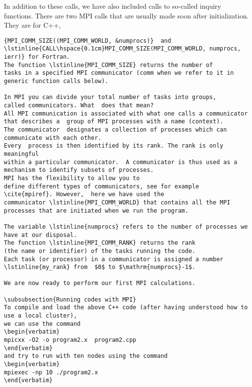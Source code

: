 In addition to these calls, we have also included calls to so-called 
inquiry functions. There are two 
MPI calls that are usually made soon after initialization. They are for C++, 
\begin{lstlisting}{MPI_COMM_SIZE((MPI_COMM_WORLD, &numprocs)}  and 
\lstinline{CALL\hspace{0.1cm}MPI_COMM_SIZE(MPI_COMM_WORLD, numprocs, ierr)} for Fortran.  
The function \lstinline{MPI_COMM_SIZE} returns the number of 
tasks in a specified MPI communicator (comm when we refer to it in generic function calls below). 

In MPI you can divide your total number of tasks into groups, 
called communicators. What  does that mean?
All MPI communication is associated with what one calls a communicator
that describes a  group of MPI processes with a name (context). 
The communicator  designates a collection of processes which can communicate with each other. 
Every  process is then identified by its rank. The rank is only meaningful
within a particular communicator.  A communicator is thus used as a mechanism to identify subsets of processes.  
MPI has the flexibility to allow you to
define different types of communicators, see for example \cite{mpiref}. However,  here we have used the
communicator \lstinline{MPI_COMM_WORLD} that contains all the MPI
processes that are initiated when we run the program.

The variable \lstinline{numprocs} refers to the number of processes we have at our disposal.
The function \lstinline{MPI_COMM_RANK} returns the rank 
(the name or identifier) of the tasks running the code. 
Each task (or processor) in a communicator is assigned a number \lstinline{my_rank} from  $0$ to $\mathrm{numprocs}-1$. 

We are now ready to perform our first MPI calculations.

\subsubsection{Running codes with MPI}
To compile and load the above C++ code (after having understood how to use a local cluster), 
we can use the command 
\begin{verbatim}
mpicxx -O2 -o program2.x  program2.cpp
\end{verbatim}
and try to run with ten nodes using the command
\begin{verbatim}
mpiexec -np 10 ./program2.x
\end{verbatim}
 

\end{lstlisting}
